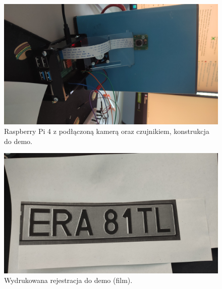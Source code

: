\documentclass[a4paper, 11pt]{article}
\begin{document}
\begin{figure}[H]
\begin{center}
\includegraphics[width=\linewidth]{raspberry.jpg}
\caption{Raspberry Pi 4 z podłączoną kamerą oraz czujnikiem, konstrukcja do demo.}
\end{center}
\end{figure}

\begin{figure}[H]
\begin{center}
\includegraphics[width=0.6\linewidth]{rejestracja.jpg}
\caption{Wydrukowana rejestracja do demo (film).}
\end{center}
\end{figure}
\end{document}
